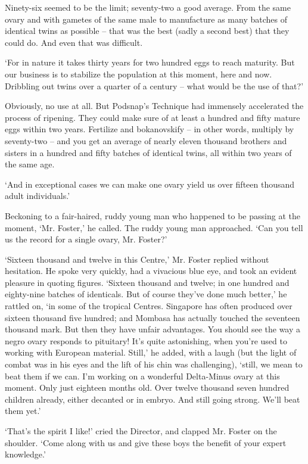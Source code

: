 \documentclass[12pt,a5paper]{book}
\newcommand{\sqm}[1]{‘#1’}
\begin{document}
Ninety-six seemed to be the limit; seventy-two a good average. From the same ovary and with gametes of the same male to manufacture as many batches of identical twins as possible – that was the best (sadly a second best) that they could do. And even that was difficult.

\sqm{For in nature it takes thirty years for two hundred eggs to reach maturity. But our business is to stabilize the population at this moment, here and now. Dribbling out twins over a quarter of a century – what would be the use of that?}

Obviously, no use at all. But Podsnap's Technique had immensely accelerated the process of ripening. They could make sure of at least a hundred and fifty mature eggs within two years. Fertilize and bokanovskify – in other words, multiply by seventy-two – and you get an average of nearly eleven thousand brothers and sisters in a hundred and fifty batches of identical twins, all within two years of the same age.

\sqm{And in exceptional cases we can make one ovary yield us over fifteen thousand adult individuals.}

Beckoning to a fair-haired, ruddy young man who happened to be passing at the moment, \sqm{Mr. Foster,} he called. The ruddy young man approached. \sqm{Can you tell us the record for a single ovary, Mr. Foster?}

\sqm{Sixteen thousand and twelve in this Centre,} Mr. Foster replied without hesitation. He spoke very quickly, had a vivacious blue eye, and took an evident pleasure in quoting figures. \sqm{Sixteen thousand and twelve; in one hundred and eighty-nine batches of identicals. But of course they've done much better,} he rattled on, \sqm{in some of the tropical Centres. Singapore has often produced over sixteen thousand five hundred; and Mombasa has actually touched the seventeen thousand mark. But then they have unfair advantages. You should see the way a negro ovary responds to pituitary! It's quite astonishing, when you're used to working with European material. Still,} he added, with a laugh (but the light of combat was in his eyes and the lift of his chin was challenging), \sqm{still, we mean to beat them if we can. I'm working on a wonderful Delta-Minus ovary at this moment. Only just eighteen months old. Over twelve thousand seven hundred children already, either decanted or in embryo. And still going strong. We'll beat them yet.}

\sqm{That's the spirit I like!} cried the Director, and clapped Mr. Foster on the shoulder. \sqm{Come along with us and give these boys the benefit of your expert knowledge.}
\end{document}
